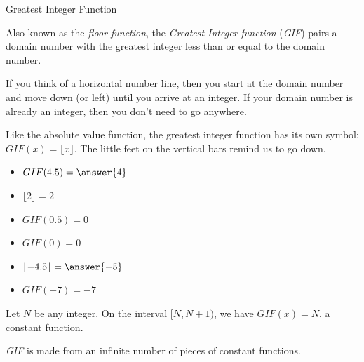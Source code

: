 \documentclass{ximera}
\begin{document}
\begin{example} Greatest Integer Function

Also known as the \textit{floor function}, the \textit{Greatest Integer function} (\textit{GIF}) pairs a domain number with the greatest integer less than or equal to the domain number.

If you think of a horizontal number line, then you start at the domain number and move down (or left) until you arrive at an integer.  If your domain number is already an integer, then you don't need to go anywhere.


Like the absolute value function, the greatest integer function has its own symbol:  $GIF(x) = \lfloor x \rfloor$. The little feet on the vertical bars remind us to go down.

\begin{itemize}
\item $GIF(4.5) = \answer{4}$
\item $\lfloor 2 \rfloor = 2$
\item $GIF(0.5) = 0$
\item $GIF(0) = 0$
\item $\lfloor -4.5 \rfloor = \answer{-5}$
\item $GIF(-7) = -7$
\end{itemize}




Let $N$ be any integer. On the interval $[N, N+1)$, we have $GIF(x) = N$, a constant function.

\textit{GIF} is made from an infinite number of pieces of constant functions.







\end{example}
\end{document}
